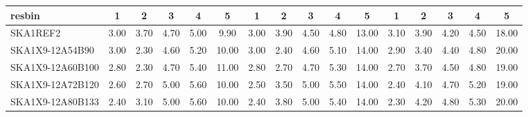 \begin{table}[H]
{{\begin{tabular}{|lccccc||ccccc||ccccc|}
 resbin  &1 & 2 & 3 & 4 & 5 & 1 & 2 & 3 & 4 & 5 & 1 & 2 & 3 & 4 & 5 \\ \hline
SKA1REF2 & 3.00 \cellcolor{blue!60.00} & 3.70 \cellcolor{red!60.00} & 4.70 \cellcolor{green!28.50} & 5.00 \cellcolor{orange!18.00} & 9.90 \cellcolor{purple!18.00} & 3.00 \cellcolor{blue!60.00} & 3.90 \cellcolor{red!60.00} & 4.50 \cellcolor{green!18.00} & 4.80 \cellcolor{orange!18.00} & 13.00 \cellcolor{purple!18.00} & 3.10 \cellcolor{blue!60.00} & 3.90 \cellcolor{red!44.25} & 4.20 \cellcolor{green!18.00} & 4.50 \cellcolor{orange!18.00} & 18.00 \cellcolor{purple!18.00}\\ \hline 
SKA1X9-12A54B90 & 3.00 \cellcolor{blue!60.00} & 2.30 \cellcolor{red!18.00} & 4.60 \cellcolor{green!18.00} & 5.20 \cellcolor{orange!32.00} & 10.00 \cellcolor{purple!21.82} & 3.00 \cellcolor{blue!60.00} & 2.40 \cellcolor{red!18.00} & 4.60 \cellcolor{green!26.40} & 5.10 \cellcolor{orange!36.00} & 14.00 \cellcolor{purple!60.00} & 2.90 \cellcolor{blue!49.50} & 3.40 \cellcolor{red!18.00} & 4.40 \cellcolor{green!32.00} & 4.80 \cellcolor{orange!33.75} & 20.00 \cellcolor{purple!60.00}\\ \hline 
SKA1X9-12A60B100 & 2.80 \cellcolor{blue!46.00} & 2.30 \cellcolor{red!18.00} & 4.70 \cellcolor{green!28.50} & 5.40 \cellcolor{orange!46.00} & 11.00 \cellcolor{purple!60.00} & 2.80 \cellcolor{blue!46.00} & 2.70 \cellcolor{red!26.40} & 4.70 \cellcolor{green!34.80} & 5.30 \cellcolor{orange!48.00} & 14.00 \cellcolor{purple!60.00} & 2.70 \cellcolor{blue!39.00} & 3.70 \cellcolor{red!33.75} & 4.50 \cellcolor{green!39.00} & 4.80 \cellcolor{orange!33.75} & 19.00 \cellcolor{purple!39.00}\\ \hline 
SKA1X9-12A72B120 & 2.60 \cellcolor{blue!32.00} & 2.70 \cellcolor{red!30.00} & 5.00 \cellcolor{green!60.00} & 5.60 \cellcolor{orange!60.00} & 10.00 \cellcolor{purple!21.82} & 2.50 \cellcolor{blue!25.00} & 3.50 \cellcolor{red!48.80} & 5.00 \cellcolor{green!60.00} & 5.50 \cellcolor{orange!60.00} & 14.00 \cellcolor{purple!60.00} & 2.40 \cellcolor{blue!23.25} & 4.10 \cellcolor{red!54.75} & 4.70 \cellcolor{green!53.00} & 5.20 \cellcolor{orange!54.75} & 19.00 \cellcolor{purple!39.00}\\ \hline 
SKA1X9-12A80B133 & 2.40 \cellcolor{blue!18.00} & 3.10 \cellcolor{red!42.00} & 5.00 \cellcolor{green!60.00} & 5.60 \cellcolor{orange!60.00} & 10.00 \cellcolor{purple!21.82} & 2.40 \cellcolor{blue!18.00} & 3.80 \cellcolor{red!57.20} & 5.00 \cellcolor{green!60.00} & 5.40 \cellcolor{orange!54.00} & 14.00 \cellcolor{purple!60.00} & 2.30 \cellcolor{blue!18.00} & 4.20 \cellcolor{red!60.00} & 4.80 \cellcolor{green!60.00} & 5.30 \cellcolor{orange!60.00} & 20.00 \cellcolor{purple!60.00}\\ \hline 

\end{tabular}}}
\end{table}

